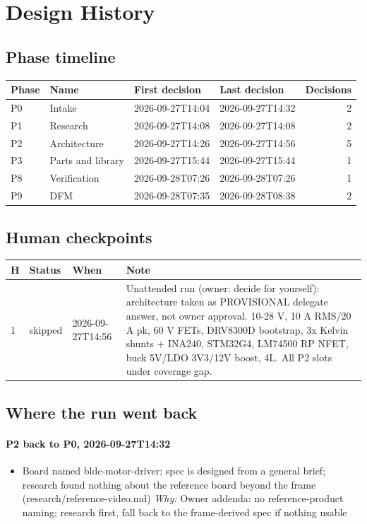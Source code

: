 \documentclass[11pt,a4paper]{article}
\begin{document}
\section{Design History}
\subsection*{Phase timeline}
{\small
\begin{longtable}{llllr}
\toprule
\textbf{Phase} & \textbf{Name} & \textbf{First decision} & \textbf{Last decision} & \textbf{Decisions} \\
\midrule
\endhead
P0 & Intake & 2026-09-27T14:04 & 2026-09-27T14:32 & 2 \\
P1 & Research & 2026-09-27T14:08 & 2026-09-27T14:08 & 2 \\
P2 & Architecture & 2026-09-27T14:26 & 2026-09-27T14:56 & 5 \\
P3 & Parts and library & 2026-09-27T15:44 & 2026-09-27T15:44 & 1 \\
P8 & Verification & 2026-09-28T07:26 & 2026-09-28T07:26 & 1 \\
P9 & DFM & 2026-09-28T07:35 & 2026-09-28T08:38 & 2 \\
\bottomrule
\end{longtable}
}
\subsection*{Human checkpoints}
{\small
\begin{longtable}{lllp{9cm}}
\toprule
\textbf{H} & \textbf{Status} & \textbf{When} & \textbf{Note} \\
\midrule
\endhead
1 & skipped & 2026-09-27T14:56 & Unattended run (owner: decide for yourself): architecture taken as PROVISIONAL delegate answer, not owner approval. 10-28 V, 10 A RMS/20 A pk, 60 V FETs, DRV8300D bootstrap, 3x Kelvin shunts + INA240, STM32G4, LM74500 RP NFET, buck 5V/LDO 3V3/12V boost, 4L. All P2 slots under coverage gap. \\
\bottomrule
\end{longtable}
}
\subsection*{Where the run went back}
\paragraph*{P2 back to P0, 2026-09-27T14:32}
\begin{itemize}
\item Board named bldc-motor-driver; spec is designed from a general brief; research found nothing about the reference board beyond the frame (research/reference-video.md) \emph{Why:} Owner addenda: no reference-product naming; research first, fall back to the frame-derived spec if nothing usable
\end{itemize}
\end{document}
